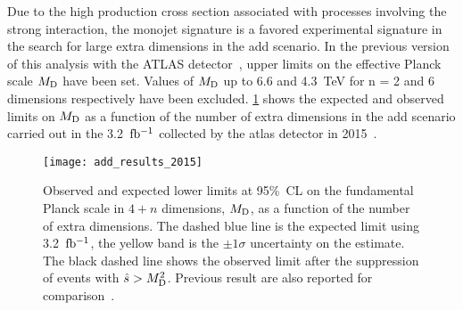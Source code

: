 Due to the high production cross section associated with processes involving the
strong interaction, the monojet signature is a favored experimental signature in
the search for large extra dimensions in the \gls{add} scenario. In the previous
version of this analysis with the ATLAS detector~\cite{MonoJetPaper}, upper
limits on the effective Planck scale $M_\mathrm{D}$ have been set. Values of $M_\mathrm{D}$ up to
6.6 and 4.3~TeV for n = 2 and 6 dimensions respectively have been
excluded. \cref{fig:add_2015} shows the expected and observed limits on $M_\mathrm{D}$ as
a function of the number of extra dimensions in the \gls{add} scenario carried
out in the 3.2~$\mbox{fb$^{-1}$}$ collected by the \gls{atlas} detector in
2015~\cite{MonoJetPaper}.
\begin{figure}[!h]
  \centering
  \texttt{[image: add\_results\_2015]}
  \caption{Observed and expected lower limits at 95\%~CL on the fundamental
    Planck scale in $4 + n$ dimensions, $M_\mathrm{D}$, as a function of the number of
    extra dimensions. The dashed blue line is the expected limit using
    3.2~$\mbox{fb$^{-1}$}$, the yellow band is the $\pm 1 \sigma$ uncertainty on the
    estimate. The black dashed line shows the observed limit after the
    suppression of events with $\hat{s} > M_\mathrm{D}^2$. Previous result are also
    reported for comparison~\cite{MonoJetPaper}.}
  \label{fig:add_2015}
\end{figure}
